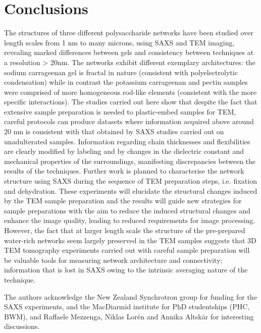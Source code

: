 \section{Conclusions}
The structures of three different polysaccharide networks have been studied over length scales from 1 nm to many microns, using SAXS and TEM imaging, revealing marked differences between gels and consistency between techniques at a resolution > 20nm. The networks exhibit different exemplary architectures: the sodium carrageenan gel is fractal in nature (consistent with polyelectrolytic condensation) while in contrast the potassium carrageenan and pectin samples were comprised of more homogeneous rod-like elements (consistent with the more specific interactions). The studies carried out here show that despite the fact that extensive sample preparation is needed to plastic-embed samples for TEM, careful protocols can produce datasets where information acquired above around 20 nm is consistent with that obtained by SAXS studies carried out on unadulterated samples. Information regarding chain thicknesses and flexibilities are clearly modified by labeling and by changes in the dielectric constant and mechanical properties of the surroundings, manifesting discrepancies between the results of the techniques. Further work is planned to characterise the network structure using SAXS during the sequence of TEM preparation steps, i.e. fixation and dehydration. These experiments will elucidate the structural changes induced by the TEM sample preparation and the results will guide new strategies for sample preparations with the aim to reduce the induced structural changes and enhance the image quality, leading to reduced requirements for image processing. However, the fact that at larger length scale the structure of the pre-prepared water-rich networks seem largely preserved in the TEM samples suggests that 3D TEM tomography experiments carried out with careful sample preparation will be valuable tools for measuring network architecture and connectivity; information that is lost in SAXS owing to the intrinsic averaging nature of the technique. 
 

The authors acknowledge the New Zealand Synchrotron group for funding for the SAXS experiments, and the MacDiarmid institute for PhD studentships (PHC, BWM), and 
Raffaele Mezzenga, Niklas Lor{\'e}n and Annika Altsk{\"a}r for interesting discussions.
